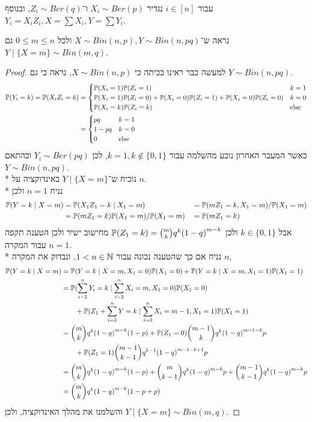 \question{}
עבור $i \in [n]$ נגדיר $X_i \sim Ber(p)$ ו־$Z_i \sim Ber(q)$, ובנוסף $Y_i = X_i Z_i, X = \sum X_i, Y = \sum Y_i$.

\subquestion{}
נראה ש־$X \sim Bin(n, p), Y \sim Bin(n, pq)$ ולכל $0 \le m \le n$ גם $Y \mid \{X = m\} \sim Bin(m, q)$.
\begin{proof}
	למעשה כבר ראינו בכיתה כי $X \sim Bin(n, p)$, נראה כי גם $Y \sim Bin(n, pq)$.
	\begin{align*}
		\mathbb{P}(Y_i = k)
		= \mathbb{P}(X_i Z_i = k)
		& = \begin{cases}
			\mathbb{P}(X_i = 1) \mathbb{P}(Z_i = 1) & k = 1 \\
			\mathbb{P}(X_i = 1) \mathbb{P}(Z_i = 0) + \mathbb{P}(X_i = 0) \mathbb{P}(Z_i = 1) + \mathbb{P}(X_i = 0) \mathbb{P}(Z_i = 0) & k = 0 \\
			\mathbb{P}(X_i = k) \mathbb{P}(Z_i = k) & \text{else}
		\end{cases} \\
		& = \begin{cases}
			pq & k = 1 \\
			1 - pq & k = 0 \\
			0 & \text{else}
		\end{cases}
	\end{align*}
	כאשר המעבר האחרון נובע מהשלמה עבור $k = 1, k \notin \{0, 1\}$, לכן $Y_i \sim Ber(pq)$ ובהתאם $Y \sim Bin(n, pq)$. \\*
	נוכיח ש־$Y \mid \{X = m\}$ באינדוקציה על $n$. \\*
	נניח $n = 1$ ולכן
	\begin{align*}
		\mathbb{P}(Y = k \mid X = m)
		& = \mathbb{P}(X_1 Z_1 = k \mid X_1 = m)
		&& = \mathbb{P}(m Z_1 = k, X_1 = m) / \mathbb{P}(X_1 = m) \\
		& = \mathbb{P}(m Z_1 = k) \mathbb{P}(X_1 = m) / \mathbb{P}(X_1 = m)
		&& = \mathbb{P}(m Z_1 = k)
	\end{align*}
	אבל $k \in \{0, 1\}$ ולכן $\mathbb{P}(Z_1 = k) = \binom{m}{k} q^k {(1 - q)}^{m - k}$ מחישוב ישיר ולכן הטענה תקפה עבור המקרה $n = 1$. \\*
	נניח אם כך שהטענה נכונה עבור $1 < n \in \mathbb{N}$, ונבדוק את המקרה $n$,
	\begin{align*}
		\mathbb{P}(Y = k \mid X = m)
		& = \mathbb{P}(Y = k \mid X = m, X_1 = 0) \mathbb{P}(X_1 = 0) + \mathbb{P}(Y = k \mid X = m, X_1 = 1) \mathbb{P}(X_1 = 1) \\
		& = \mathbb{P}(\sum_{i = 2}^n Y_i = k \mid \sum_{i = 2}^n X_i = m, X_1 = 0) \mathbb{P}(X_1 = 0) \\
		& \qquad + \mathbb{P}(Z_1 + \sum_{i = 2}^n Y = k \mid \sum_{i = 2}^n X_i = m - 1, X_1 = 1) \mathbb{P}(X_1 = 1) \\
		& = \binom{m}{k} q^k {(1 - q)}^{m - k} (1 - p) + \mathbb{P}(Z_1 = 0) \binom{m - 1}{k} q^k {(1 - q)}^{m - 1 - k} p \\
		& \qquad + \mathbb{P}(Z_1 = 1) \binom{m - 1}{k - 1} q^{k - 1} {(1 - q)}^{m - 1 - k + 1} p \\
		& = \binom{m}{k} q^k {(1 - q)}^{m - k} (1 - p) + \binom{m}{k - 1} q^k {(1 - q)}^{m - k} p + \binom{m - 1}{k - 1} q^k {(1 - q)}^{m - k} p \\
		& = \binom{m}{k} q^k {(1 - q)}^{m - k} (1 - p + p)
	\end{align*}
	והשלמנו את מהלך האינדוקציה, ולכן $Y \mid \{X = m\} \sim Bin(m, q)$.
\end{proof}

